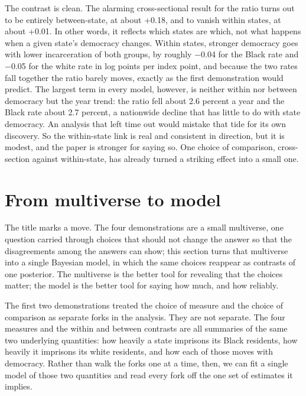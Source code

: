 \documentclass[
  12pt,
]{article}
\begin{document}
The contrast is clean. The alarming cross-sectional result for the ratio
turns out to be entirely between-state, at about +0.18, and to vanish
within states, at about +0.01. In other words, it reflects which states
are which, not what happens when a given state's democracy changes.
Within states, stronger democracy goes with lower incarceration of both
groups, by roughly −0.04 for the Black rate and −0.05 for the white rate
in log points per index point, and because the two rates fall together
the ratio barely moves, exactly as the first demonstration would
predict. The largest term in every model, however, is neither within nor
between democracy but the year trend: the ratio fell about 2.6 percent a
year and the Black rate about 2.7 percent, a nationwide decline that has
little to do with state democracy. An analysis that left time out would
mistake that tide for its own discovery. So the within-state link is
real and consistent in direction, but it is modest, and the paper is
stronger for saying so. One choice of comparison, cross-section against
within-state, has already turned a striking effect into a small one.

\section{From multiverse to model}\label{from-multiverse-to-model}

The title marks a move. The four demonstrations are a small multiverse,
one question carried through choices that should not change the answer
so that the disagreements among the answers can show; this section turns
that multiverse into a single Bayesian model, in which the same choices
reappear as contrasts of one posterior. The multiverse is the better
tool for revealing that the choices matter; the model is the better tool
for saying how much, and how reliably.

The first two demonstrations treated the choice of measure and the
choice of comparison as separate forks in the analysis. They are not
separate. The four measures and the within and between contrasts are all
summaries of the same two underlying quantities: how heavily a state
imprisons its Black residents, how heavily it imprisons its white
residents, and how each of those moves with democracy. Rather than walk
the forks one at a time, then, we can fit a single model of those two
quantities and read every fork off the one set of estimates it implies.
\end{document}
